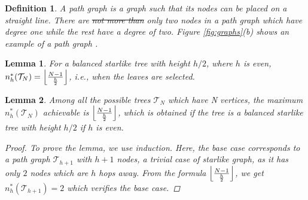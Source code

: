 \documentclass[letterpaper]{article} \usepackage{aaai20}  \usepackage{times}  \usepackage{helvet} \usepackage{courier}  \usepackage[hyphens]{url}  \usepackage{graphicx} \urlstyle{rm} \def\UrlFont{\rm}  \usepackage{graphicx}  \frenchspacing  \setlength{\pdfpagewidth}{8.5in}  \setlength{\pdfpageheight}{11in}
\newtheorem{definition}{Definition}
\newtheorem{lemma}{Lemma}
\begin{document}
	\begin{definition}
		A path graph is a graph such that its nodes can be placed on a straight line. There are \st{not more than} only two nodes in a path graph which have degree one while the rest have a degree of two. Figure \ref{fig:graphs}(b) shows an example of a path graph \cite{path-graph}. 
	\end{definition}

	
	\begin{lemma}
		\label{lem:starlike-n}
		For a balanced starlike tree with height $h/2$, where $h$ is even, $n^{*}_{h}(\mathcal{T}_{N}) = \Bigl \lfloor \frac{N-1}{\frac{h}{2}} \Bigr \rfloor$, i.e., when the leaves are selected.
	\end{lemma}
	
\begin{lemma}
		\label{lem:star}
		Among all the possible trees $\mathcal{T}_{N}$ which have N vertices, the maximum $n^{*}_{h}(\mathcal{T}_{N})$ achievable is $ \Bigl \lfloor \frac{N-1}{\frac{h}{2}} \Bigr \rfloor$, which is obtained if the tree is a balanced starlike tree with height $h/2$ if $h$ is even.
		\begin{proof} 
			 To prove the lemma, we use induction. Here, the base case corresponds to a path graph $\mathcal{T}_{h+1}$ with $h+1$ nodes, a trivial case of starlike graph, as it has only $2$ nodes which are $h$ hops away. From the formula $\Bigl \lfloor \frac{N-1}{\frac{h}{2}} \Bigr \rfloor$, we get $n^{*}_{h}(\mathcal{T}_{h+1}) = 2$ which verifies the base case.


\end{proof}
\end{lemma}
\end{document}
